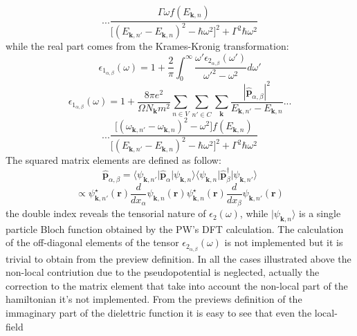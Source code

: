 \documentclass[twocolumn]{article}
\begin{document}
\begin{equation}
...\frac{\Gamma \omega f(E_{\textbf{k},n})}{\big[(E_{\textbf{k},n'}-E_{\textbf{k},n})^2-\hbar\omega^2\big]^2+\Gamma^2\hbar\omega^2}
\end{equation}
while the real part comes from the Krames-Kronig transformation:
\begin{equation}
\epsilon_{1_{\alpha,\beta}}(\omega)=1+\frac{2}{\pi}\int_{0}^{\infty}\frac{\omega' \epsilon_{2_{\alpha,\beta}}(\omega')}
{\omega'^{2}-\omega^{2}}d\omega'
\end{equation} 
\begin{displaymath}
\epsilon_{1_{\alpha,\beta}}(\omega)=1+\frac{8 \pi e^2}{\Omega N_{\textbf{k}} m^2}\sum_{n\in V}\sum_{n'\in C}\sum_{\textbf{k}}
\frac{|\hat{\textbf{p}}_{\alpha,\beta}|^2}{E_{\textbf{k},n'}-E_{\textbf{k},n}}...
\end{displaymath}
\begin{equation}
...\frac{\big[(\omega_{\textbf{k},n'}-\omega_{\textbf{k},n})^2-\omega^2\big]f(E_{\textbf{k},n})}{\big[(E_{\textbf{k},n'}-E_{\textbf{k},n})^2
-\hbar\omega^2\big]^2+\Gamma^2\hbar\omega^2}
\end{equation}
The squared matrix elements are defined as follow:
\begin{equation}
\hat{\textbf{p}}_{\alpha,\beta}=\langle\psi_{\textbf{k},n'}\vert\hat{\textbf{p}}_{\alpha}\vert \psi_{\textbf{k},n}\rangle
\langle\psi_{\textbf{k},n}\vert\hat{\textbf{p}}_{\beta}^{\dagger}\vert\psi_{\textbf{k},n'}\rangle
\label{nos}
\end{equation}
\begin{equation}
\propto \psi_{\textbf{k},n'}^{\star}(\textbf{r})\frac{d}{d x_{\alpha}}\psi_{\textbf{k},n}(\textbf{r})
\psi_{\textbf{k},n}^{\star}(\textbf{r})\frac{d}{d x_{\beta}}\psi_{\textbf{k},n'}(\textbf{r})
\end{equation}
the double index reveals the tensorial nature of $\epsilon_{2}(\omega)$, while $\vert \psi_{\textbf{k},n}\rangle$ is a
single particle Bloch function obtained by the PW's DFT calculation. 
The calculation of the off-diagonal elements of 
the tensor $\epsilon_{2_{\alpha,\beta}}(\omega)$ is not implemented but it is trivial to obtain from the preview definition. 
In all the cases illustrated above the non-local contriution due to the pseudopotential is neglected, actually the 
correction to the matrix element that take into account the non-local part of the hamiltonian it's not implemented.
From the previews definition of the immaginary part of the dielettric function it is easy to see that even the local-field 
\end{document}

